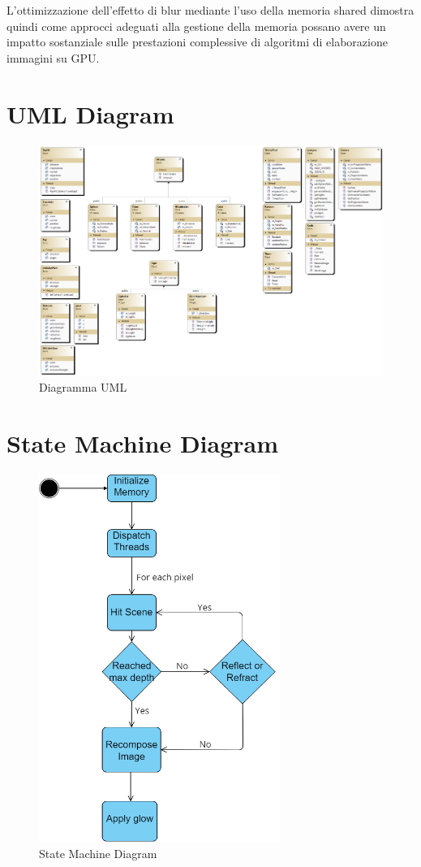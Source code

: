 \documentclass[12pt]{article}
\begin{document}
L'ottimizzazione dell'effetto di blur mediante l'uso della memoria shared dimostra quindi come approcci adeguati alla gestione della memoria possano avere un impatto sostanziale sulle prestazioni complessive di algoritmi di elaborazione immagini su GPU.


\section{UML Diagram}
\begin{figure}[htbp]
  \centering
  \includegraphics[width=1\textwidth]{ClassDiagram.png}
  \caption{Diagramma UML}
  \label{fig:uml_diagram}
\end{figure}

\newpage
\section{State Machine Diagram}
\begin{figure}[htbp]
  \centering
  \includegraphics[width=0.7\textwidth]{StateMachineDiagram.png}
  \caption{State Machine Diagram}
  \label{fig:state_machine_diagram}
\end{figure}
\end{document}
